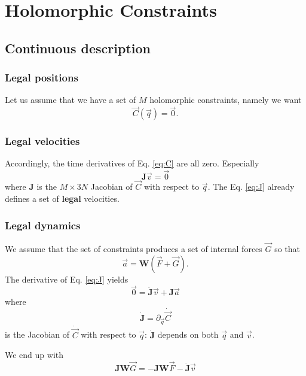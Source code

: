 \documentclass[aps,onecolumn]{revtex4}
\newcommand{\mymat}[1]{\boldsymbol{#1}}
\begin{document}
\section{Holomorphic Constraints}
\subsection{Continuous description}
\subsubsection{Legal positions}

Let us assume that we have a set of $M$ holomorphic constraints, namely we want
\begin{equation}
	\label{eq:C}
	\vec{C}\left(\vec{q}\right) = \vec{0}.
\end{equation}

\subsubsection{Legal velocities}
Accordingly, the time derivatives of Eq. \eqref{eq:C} are all zero.
Especially
\begin{equation}
	\label{eq:J}
	\mymat{J}\vec{v} = \vec{0}
\end{equation}
where $\mymat{J}$ is the $M\times 3N$ Jacobian of $\vec{C}$ with respect to $\vec{q}$.
The Eq. \eqref{eq:J} already defines a set of \textbf{legal} velocities.

\subsubsection{Legal dynamics}
We assume that the set of constraints produces a set of internal forces $\vec{G}$ so that
\begin{equation}
	\vec{a} = \mymat{W} \left( \vec{F} + \vec{G} \right).
\end{equation}
The derivative of Eq. \eqref{eq:J} yields
\begin{equation}
	\vec{0} = \dot{\mymat{J}}\vec{v} + \mymat{J}\vec{a}
\end{equation}
where
\begin{equation}
	\dot{\mymat{J}} = \partial_{\vec{q}} \dot{\vec{C}}
\end{equation}
is the Jacobian of $\dot{\vec{C}}$ with respect to $\vec{q}$: $\dot{\mymat{J}}$ depends on both $\vec{q}$ and $\vec{v}$.

We end up with
\begin{equation}
\label{eq:JW}
	\mymat{J}\mymat{W}\vec{G} = 
	-\mymat{J}\mymat{W}\vec{F} - \dot{\mymat{J}}\vec{v}
\end{equation}
\end{document}
